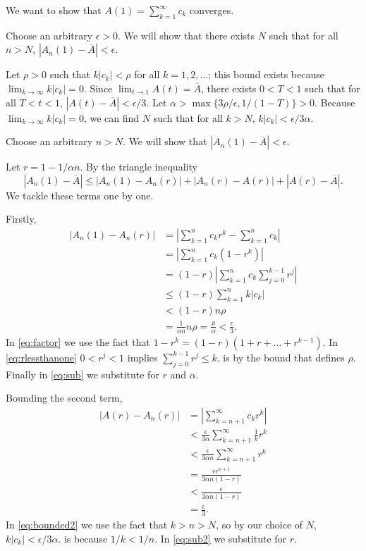 \documentclass[oneside]{article}
\newcommand\abs[1]{\left|#1\right|}
\begin{document}
\begin{enumerate}[label=(\alph*)]
    We want to show that $A(1) = \sum_{k=1}^\infty c_k$ converges. 

    Choose an arbitrary $\epsilon > 0$. We will show that there exists $N$ such that for all $n > N$, $\abs{A_n(1) - \overline{A}} < \epsilon$.

    Let $\rho > 0$ such that $k\abs{c_k} < \rho$ for all $k = 1,2,\dots$; this bound exists because $\lim_{k\to\infty}k\abs{c_k} = 0$. Since $\lim_{t\to1} A(t) = \overline{A}$, there exists $0 < T < 1$ such that for all $T < t < 1$, $\abs{A(t) - \overline{A}} < \epsilon/3$. Let $\alpha > \max\{3\rho/\epsilon, 1/(1-T)\} > 0$. Because $\lim_{k\to\infty} k\abs{c_k}=0$, we can find $N$ such that for all $k>N$, $k\abs{c_k} < \epsilon/3\alpha$.

    Choose an arbitrary $n > N$. We will show that $\abs{A_n(1) - \overline{A}} < \epsilon$.

    Let $r = 1 - 1/\alpha n$. By the triangle inequality\[
      \abs{A_n(1) - \overline{A}}
      \leq \abs{A_n(1) - A_n(r)}  + \abs{A_n(r) - A(r)} + \abs{A(r) - \overline{A}}
      \text{.}
    \] We tackle these terms one by one.

    Firstly,\begin{align}
      \abs{A_n(1) - A_n(r)}
      &= \abs{\sum_{k=1}^n c_k r^k - \sum_{k=1}^n c_k} \nonumber\\
      &= \abs{\sum_{k=1}^n c_k (1 - r^k)} \nonumber\\
      &= (1-r)\abs{\sum_{k=1}^n c_k \sum_{j=0}^{k-1} r^j} \label{eq:factor}\\
      &\leq (1-r)\sum_{k=1}^n k\abs{c_k} \label{eq:rlessthanone} \\
      &< (1-r)n\rho \label{eq:bounded}\\
      &= \frac1{\alpha n}n\rho = \frac{\rho}{\alpha} < \frac{\epsilon}{3} \text{.} \label{eq:sub}
    \end{align} In \cref{eq:factor} we use the fact that $1 - r^k = (1-r)(1 + r + \dots + r^{k-1})$. In \cref{eq:rlessthanone} $0 < r^j < 1$ implies $\sum_{j=0}^{k-1} r^j \leq k$.  is by the bound that defines $\rho$. Finally in \cref{eq:sub} we substitute for $r$ and $\alpha$.

    Bounding the second term, \begin{align}
      \abs{A(r) - A_n(r)}
      &= \abs{\sum_{k=n+1}^\infty c_k r^k} \nonumber\\
      &< \frac{\epsilon}{3\alpha} \sum_{k=n+1}^\infty \frac1k r^k \label{eq:bounded2}\\
      &< \frac{\epsilon}{3\alpha n}\sum_{k=n+1}^\infty r^k \label{eq:nlessthank}\\
      &= \frac{\epsilon r^{n+1}}{3\alpha n (1-r)} \nonumber\\
      &< \frac{\epsilon}{3\alpha n (1-r)}  \nonumber\\
      &= \frac{\epsilon}{3} \text{.} \label{eq:sub2}
    \end{align} In \cref{eq:bounded2} we use the fact that $k > n > N$, so by our choice of $N$, $k\abs{c_k} < \epsilon/3\alpha$.  is because $1/k < 1/n$. In \cref{eq:sub2} we substitute for $r$.


\end{enumerate}
\end{document}
